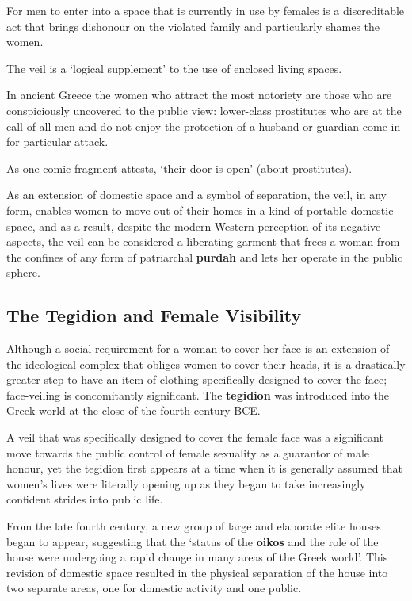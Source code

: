 \begin{rmk}
    For men to enter into a space that is currently in use by females is a discreditable act that brings dishonour on the violated family and particularly shames the women.
\end{rmk}

The veil is a `logical supplement' to the use of enclosed living spaces.

\begin{nte}
    In ancient Greece the women who attract the most notoriety are those who are conspiciously uncovered to the public view: lower-class prostitutes who are at the call of all men and do not enjoy the protection of a husband or guardian come in for particular attack.
\end{nte}


As one comic fragment attests, `their door is open' (about prostitutes).

\begin{rmk}
    As an extension of domestic space and a symbol of separation, the veil, in any form, enables women to move out of their homes in a kind of portable domestic space, and as a result, despite the modern Western perception of its negative aspects, the veil can be considered a liberating garment that frees a woman from the confines of any form of patriarchal \textbf{purdah} and lets her operate in the public sphere.
\end{rmk}


\subsection{The Tegidion and Female Visibility}

Although a social requirement for a woman to cover her face is an extension of the ideological complex that obliges women to cover their heads, it is a drastically greater step to have an item of clothing specifically designed to cover the face; face-veiling is concomitantly significant.  The \textbf{tegidion} was introduced into the Greek world at the close of the fourth century BCE. 

A veil that was specifically designed to cover the female face was a significant move towards the public control of female sexuality as a guarantor of male honour, yet the tegidion first appears at a time when it is generally assumed that women's lives were literally opening up as they began to take increasingly confident strides into public life.

From the late fourth century, a new group of large and elaborate elite houses began to appear, suggesting that the `status of the \textbf{oikos} and the role of the house were undergoing a rapid change in many areas of the Greek world'. This revision of domestic space resulted in the physical separation of the house into two separate areas, one for domestic activity and one public.

